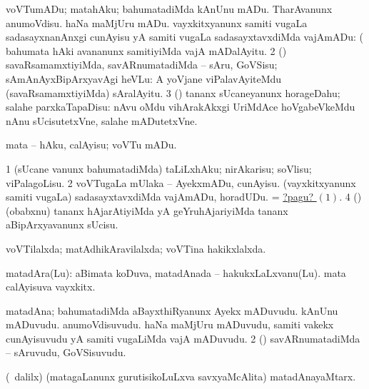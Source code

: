 \bentry
{} 
\gl{\sakirx}
\expl{}
\bmng
\bnum
{} voVTumADu; matahAku; bahumatadiMda 
\banum
{} kAnUnu mADu. 
 TharAvanunx anumoVdisu. 
 haNa maMjUru mADu. 
 vayxkitxyanunx samiti \mo vugaLa sadasayxnanAnxgi cunAyisu yA samiti \mo vugaLa sadasayxtavxdiMda vajAmADu:  (  bahumata hAki avananunx samitiyiMda vajA mADalAyitu. 
\eanum
\numie
\num{2} (\AmA) savaRsamamxtiyiMda, savARnumatadiMda -- sAru, GoVSisu; sAmAnAyxBipArxyavAgi heVLu:  A yoVjane viPalavAyiteMdu (savaRsamamxtiyiMda) sAralAyitu. 
\num{3} (\AmA) tananx sUcaneyanunx horageDahu; salahe parxkaTapaDisu:  nAvu oMdu vihArakAkxgi UriMdAce hoVgabeVkeMdu nAnu sUcisutetxVne, salahe mADutetxVne. 
\enum
\emng

\noindent 
\gl{\akirx}
\expl{}
\bmng
mata -- hAku, calAyisu; voVTu mADu. 
\emng

\noindent 
\gl{\pagu}
\expl{}
\bmng
\hypertarget{vote2 pagu1}{} 
\bnum
\num{1}  (sUcane \mo vanunx bahumatadiMda) taLiLxhAku; nirAkarisu; soVlisu; viPalagoLisu. 
\num{2}  voVTugaLa mUlaka -- AyekxmADu, cunAyisu. 
  
\banum
{} (vayxkitxyanunx samiti \mo vugaLa) sadasayxtavxdiMda vajAmADu, horadUDu. 
 = \hyperlink{vote2 pagu1}{?pagu? \((1)\)}. 
\eanum
\numie
\num{4}  (\AmA) (obabxnu) tananx hAjarAtiyiMda yA geYruhAjariyiMda tananx aBipArxyavanunx sUcisu. 
\enum
\emng
\eentry

\bentry
{} 
\gl{\gu}
\expl{}
\bmng
 voVTilalxda; matAdhikAravilalxda; voVTina hakikxlalxda. 
\emng
\eentry

\bentry
{} 
\gl{\nA}
\expl{}
\bmng
 matadAra(Lu): 
\banum
{} aBimata koDuva, matadAnada -- hakukxLaLxvanu(Lu). 
 mata calAyisuva vayxkitx. 
\eanum
\emng
\eentry

\bentry
{} 
\gl{\nA}
\expl{}
\bmng
\bnum
{} matadAna; bahumatadiMda 
\banum
{} aBayxthiRyanunx Ayekx mADuvudu. 
 kAnUnu mADuvudu. 
 anumoVdisuvudu. 
 haNa maMjUru mADuvudu, samiti \mo vakekx cunAyisuvudu yA samiti \mo vugaLiMda vajA mADuvudu. 
\eanum
\numie
\num{2} (\AmA) savARnumatadiMda -- sAruvudu, GoVSisuvudu. 
\enum
\emng
\eentry

\bentry
{} 
\gl{\nA}
\expl{}
\bmng
 (\kanmu\ \ame dalilx) (matagaLanunx gurutisikoLuLxva savxyaMcAlita) matadAnayaMtarx. 
\emng
\eentry

